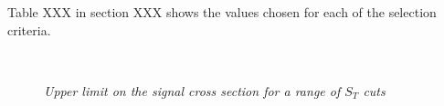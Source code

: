 \documentclass{cmspaper}
\begin{document}
Table XXX in section XXX shows the values chosen for each of the selection criteria.  

\begin{figure}[htbp]
  \begin{center}
       \\
    \caption{\small \sl Upper limit on the signal cross section for a range of $S_T$ cuts }
    \label{fig:optimization}
  \end{center}
\end{figure}
\end{document}
